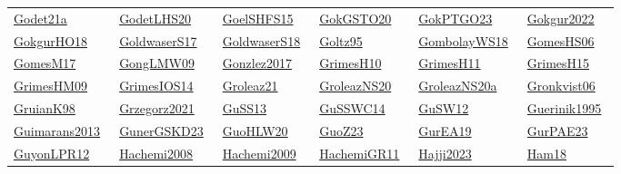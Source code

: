 \begin{longtable}{*{6}{l}}
\href{../works/Godet21a.pdf}{Godet21a}~\cite{Godet21a} & \href{../works/GodetLHS20.pdf}{GodetLHS20}~\cite{GodetLHS20} & \href{../works/GoelSHFS15.pdf}{GoelSHFS15}~\cite{GoelSHFS15} & \href{../works/GokGSTO20.pdf}{GokGSTO20}~\cite{GokGSTO20} & \href{../works/GokPTGO23.pdf}{GokPTGO23}~\cite{GokPTGO23} & \href{../}{Gokgur2022}~\cite{Gokgur2022}\\ 
\href{../works/GokgurHO18.pdf}{GokgurHO18}~\cite{GokgurHO18} & \href{../works/GoldwaserS17.pdf}{GoldwaserS17}~\cite{GoldwaserS17} & \href{../works/GoldwaserS18.pdf}{GoldwaserS18}~\cite{GoldwaserS18} & \href{../works/Goltz95.pdf}{Goltz95}~\cite{Goltz95} & \href{../works/GombolayWS18.pdf}{GombolayWS18}~\cite{GombolayWS18} & \href{../works/GomesHS06.pdf}{GomesHS06}~\cite{GomesHS06}\\ 
\href{../works/GomesM17.pdf}{GomesM17}~\cite{GomesM17} & \href{../}{GongLMW09}~\cite{GongLMW09} & \href{../}{Gonzlez2017}~\cite{Gonzlez2017} & \href{../works/GrimesH10.pdf}{GrimesH10}~\cite{GrimesH10} & \href{../works/GrimesH11.pdf}{GrimesH11}~\cite{GrimesH11} & \href{../works/GrimesH15.pdf}{GrimesH15}~\cite{GrimesH15}\\ 
\href{../works/GrimesHM09.pdf}{GrimesHM09}~\cite{GrimesHM09} & \href{../works/GrimesIOS14.pdf}{GrimesIOS14}~\cite{GrimesIOS14} & \href{../works/Groleaz21.pdf}{Groleaz21}~\cite{Groleaz21} & \href{../works/GroleazNS20.pdf}{GroleazNS20}~\cite{GroleazNS20} & \href{../works/GroleazNS20a.pdf}{GroleazNS20a}~\cite{GroleazNS20a} & \href{../works/Gronkvist06.pdf}{Gronkvist06}~\cite{Gronkvist06}\\ 
\href{../works/GruianK98.pdf}{GruianK98}~\cite{GruianK98} & \href{../}{Grzegorz2021}~\cite{Grzegorz2021} & \href{../works/GuSS13.pdf}{GuSS13}~\cite{GuSS13} & \href{../}{GuSSWC14}~\cite{GuSSWC14} & \href{../works/GuSW12.pdf}{GuSW12}~\cite{GuSW12} & \href{../}{Guerinik1995}~\cite{Guerinik1995}\\ 
\href{../}{Guimarans2013}~\cite{Guimarans2013} & \href{../}{GunerGSKD23}~\cite{GunerGSKD23} & \href{../}{GuoHLW20}~\cite{GuoHLW20} & \href{../works/GuoZ23.pdf}{GuoZ23}~\cite{GuoZ23} & \href{../works/GurEA19.pdf}{GurEA19}~\cite{GurEA19} & \href{../works/GurPAE23.pdf}{GurPAE23}~\cite{GurPAE23}\\ 
\href{../works/GuyonLPR12.pdf}{GuyonLPR12}~\cite{GuyonLPR12} & \href{../}{Hachemi2008}~\cite{Hachemi2008} & \href{../}{Hachemi2009}~\cite{Hachemi2009} & \href{../works/HachemiGR11.pdf}{HachemiGR11}~\cite{HachemiGR11} & \href{../}{Hajji2023}~\cite{Hajji2023} & \href{../works/Ham18.pdf}{Ham18}~\cite{Ham18}\\ 

\end{longtable}
